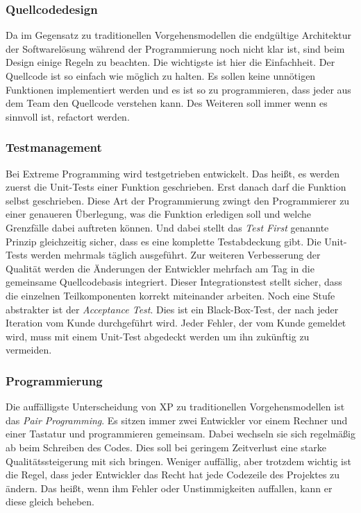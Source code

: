 \subsubsection{Quellcodedesign}
Da im Gegensatz zu traditionellen Vorgehensmodellen die endgültige Architektur der Softwarelösung während der Programmierung noch nicht klar ist, sind beim Design einige Regeln zu beachten. Die wichtigste ist hier die Einfachheit. Der Quellcode ist so einfach wie möglich zu halten. Es sollen keine unnötigen Funktionen implementiert werden und es ist so zu programmieren, dass jeder aus dem Team den Quellcode verstehen kann. Des Weiteren soll immer wenn es sinnvoll ist, refactort werden.

\subsubsection{Testmanagement}
Bei Extreme Programming wird testgetrieben entwickelt. Das heißt, es werden zuerst die Unit-Tests einer Funktion geschrieben. Erst danach darf die Funktion selbst geschrieben. Diese Art der Programmierung zwingt den Programmierer zu einer genaueren Überlegung, was die Funktion erledigen soll und welche Grenzfälle dabei auftreten können. Und dabei stellt das \emph{Test First} genannte Prinzip gleichzeitig sicher, dass es eine komplette Testabdeckung gibt. Die Unit-Tests werden mehrmals täglich ausgeführt. Zur weiteren Verbesserung der Qualität werden die Änderungen der Entwickler mehrfach am Tag in die gemeinsame Quellcodebasis integriert. Dieser Integrationstest stellt sicher, dass die einzelnen Teilkomponenten korrekt miteinander arbeiten. Noch eine Stufe abstrakter ist der \emph{Acceptance Test}. Dies ist ein Black-Box-Test, der nach jeder Iteration vom Kunde durchgeführt wird. Jeder Fehler, der vom Kunde gemeldet wird, muss mit einem Unit-Test abgedeckt werden um ihn zukünftig zu vermeiden.

\subsubsection{Programmierung}
Die auffälligste Unterscheidung von XP zu traditionellen Vorgehensmodellen ist das \emph{Pair Programming}. Es sitzen immer zwei Entwickler vor einem Rechner und einer Tastatur und programmieren gemeinsam. Dabei wechseln sie sich regelmäßig ab beim Schreiben des Codes. Dies soll bei geringem Zeitverlust eine starke Qualitätssteigerung mit sich bringen. Weniger auffällig, aber trotzdem wichtig ist die Regel, dass jeder Entwickler das Recht hat jede Codezeile des Projektes zu ändern. Das heißt, wenn ihm Fehler oder Unstimmigkeiten auffallen, kann er diese gleich beheben. 

